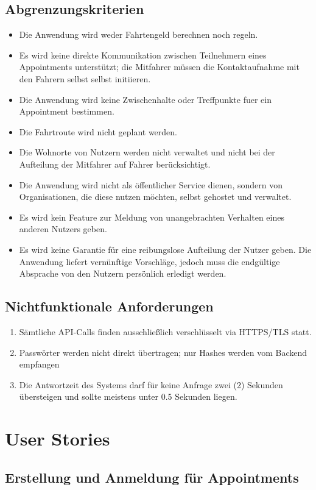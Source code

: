\documentclass[11pt,a4paper]{article}
\begin{document}
\subsection{Abgrenzungskriterien}
\begin{itemize}
\item Die Anwendung wird weder Fahrtengeld berechnen noch regeln.
\item Es wird keine direkte Kommunikation zwischen Teilnehmern eines Appointments unterstützt; die Mitfahrer müssen die Kontaktaufnahme mit den Fahrern selbst selbst initiieren.
\item Die Anwendung wird keine Zwischenhalte oder Treffpunkte fuer ein Appointment bestimmen.
\item Die Fahrtroute wird nicht geplant werden.
\item Die Wohnorte von Nutzern werden nicht verwaltet und nicht bei der Aufteilung der Mitfahrer auf Fahrer berücksichtigt.
\item Die Anwendung wird nicht als öffentlicher Service dienen, sondern von Organisationen, die diese nutzen möchten, selbst gehostet und verwaltet.
\item Es wird kein Feature zur Meldung von unangebrachten Verhalten eines anderen Nutzers geben.
\item Es wird keine Garantie für eine reibungslose Aufteilung der Nutzer geben. Die Anwendung liefert vernünftige Vorschläge, jedoch muss die endgültige Absprache von den Nutzern persönlich erledigt werden.
\end{itemize}

\subsection{Nichtfunktionale Anforderungen}
\begin{enumerate}
\item Sämtliche API-Calls finden ausschließlich verschlüsselt via HTTPS/TLS statt.
\item Passwörter werden nicht direkt übertragen; nur Hashes werden vom Backend empfangen
\item Die Antwortzeit des Systems darf für keine Anfrage zwei (2) Sekunden übersteigen und sollte meistens unter 0.5 Sekunden liegen.
\end{enumerate}


\section{User Stories}
\subsection{Erstellung und Anmeldung für Appointments}
\end{document}
